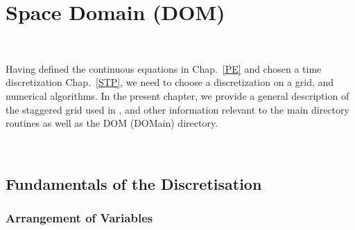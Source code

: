 \chapter{Space Domain (DOM) }
\label{DOM}
\minitoc



\newpage
$\ $\newline    %

Having defined the continuous equations in Chap.~\ref{PE} and chosen a time 
discretization Chap.~\ref{STP}, we need to choose a discretization on a grid, 
and numerical algorithms. In the present chapter, we provide a general description 
of the staggered grid used in \NEMO, and other information relevant to the main 
directory routines as well as the DOM (DOMain) directory. 

$\ $\newline    %

\section{Fundamentals of the Discretisation}
\label{DOM_basics}

\subsection{Arrangement of Variables}
\label{DOM_cell}

